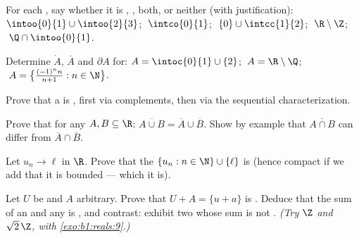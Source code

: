 \begin{exercise}[$\star$]\label{exo:b1:topology:1}
For each , say whether it is , , both, or neither (with
justification): $\intoo{0}{1} \cup \intoo{2}{3}$; $\;\intco{0}{1}$;
$\;\{0\} \cup \intcc{1}{2}$; $\;\R \setminus \Z$; $\;\Q \cap
\intoo{0}{1}$.
\end{exercise}

\begin{exercise}[$\star$]\label{exo:b1:topology:2}
Determine $\mathring A$, $\overline A$ and $\partial A$ for:
$A = \intoc{0}{1} \cup \{2\}$; $\;A = \R \setminus \Q$;
$\;A = \bigl\{\frac{(-1)^n n}{n+1} : n \in \N\bigr\}$.
\end{exercise}

\begin{exercise}[$\star$]\label{exo:b1:topology:3}
Prove that a  is , first via complements, then via
the sequential characterization.
\end{exercise}

\begin{exercise}[$\star$]\label{exo:b1:topology:4}
Prove that for any $A, B \subseteq \R$: $\overline{A \cup B} =
\overline A \cup \overline B$. Show by example that
$\overline{A \cap B}$ can differ from $\overline A \cap \overline
B$.
\end{exercise}

\begin{exercise}[$\star\star$]\label{exo:b1:topology:5}
Let $u_n \to \ell$ in $\R$. Prove that the  $\{u_n : n \in \N\}
\cup \{\ell\}$ is  (hence compact if we add that it is
bounded --- which it is).
\end{exercise}

\begin{exercise}[$\star\star$]\label{exo:b1:topology:6}
Let $U$ be  and $A$ arbitrary. Prove that $U + A = \{u + a\}$ is
. Deduce that the sum of an  and any  is , and
contrast: exhibit two \emph{}  whose sum is not .
\emph{(Try $\Z$ and $\sqrt 2\,\Z$, with \cref{exo:b1:reals:9}.)}
\end{exercise}

